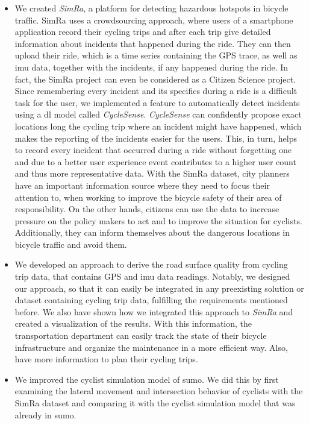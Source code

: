 \begin{itemize}
\item We created \textit{SimRa}, a platform for detecting hazardous hotspots in bicycle traffic.
SimRa uses a crowdsourcing approach, where users of a smartphone application record their cycling trips and after each trip give detailed information about incidents that happened during the ride.
They can then upload their ride, which is a time series containing the GPS trace, as well as \ac{imu} data, together with the incidents, if any happened during the ride.
In fact, the SimRa project can even be considered as a Citizen Science project.
Since remembering every incident and its specifics during a ride is a difficult task for the user, we implemented a feature to automatically detect incidents using a \ac{dl} model called \textit{CycleSense}.
\textit{CycleSense} can confidently propose exact locations long the cycling trip where an incident might have happened, which makes the reporting of the incidents easier for the users.
This, in turn, helps to record every incident that occurred during a ride without forgetting one and due to a better user experience event contributes to a higher user count and thus more representative data. 
With the SimRa dataset, city planners have an important information source where they need to focus their attention to, when working to improve the bicycle safety of their area of responsibility.
On the other hands, citizens can use the data to increase pressure on the policy makers to act and to improve the situation for cyclists.
Additionally, they can inform themselves about the dangerous locations in bicycle traffic and avoid them.
\item We developed an approach to derive the road surface quality from cycling trip data, that contains GPS and \ac{imu} data readings.
Notably, we designed our approach, so that it can easily be integrated in any preexisting solution or dataset containing cycling trip data, fulfilling the requirements mentioned before.
We also have shown how we integrated this approach to \textit{SimRa} and created a visualization of the results.
With this information, the transportation department can easily track the state of their bicycle infrastructure and organize the maintenance in a more efficient way.
Also, have more information to plan their cycling trips.
\item We improved the cyclist simulation model of \ac{sumo}.
We did this by first examining the lateral movement and intersection behavior of cyclists with the SimRa dataset and comparing it with the cyclist simulation model that was already in \ac{sumo}. 

\end{itemize}
